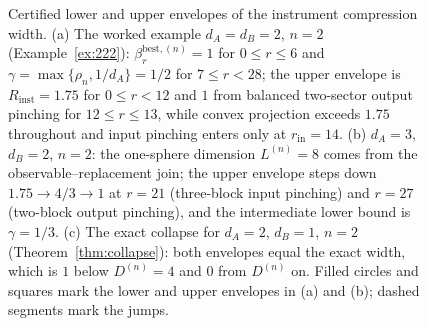 \documentclass[11pt,a4paper]{article}
\begin{document}
\begin{figure}[t]
\medskip
{}
{\small\caption{Certified lower and upper envelopes of the instrument compression width. (a) The worked example $d_A=d_B=2$, $n=2$ (Example~\ref{ex:222}): $\beta_r^{\mathrm{best},(n)}=1$ for $0\le r\le6$ and $\gamma=\max\{\rho_n,1/d_A\}=1/2$ for $7\le r<28$; the upper envelope is $R_{\mathrm{inst}}=1.75$ for $0\le r<12$ and $1$ from balanced two-sector output pinching for $12\le r\le13$, while convex projection exceeds $1.75$ throughout and input pinching enters only at $r_{\mathrm{in}}=14$. (b) $d_A=3$, $d_B=2$, $n=2$: the one-sphere dimension $L^{(n)}=8$ comes from the observable--replacement join; the upper envelope steps down $1.75\to4/3\to1$ at $r=21$ (three-block input pinching) and $r=27$ (two-block output pinching), and the intermediate lower bound is $\gamma=1/3$. (c) The exact collapse for $d_A=2$, $d_B=1$, $n=2$ (Theorem~\ref{thm:collapse}): both envelopes equal the exact width, which is $1$ below $D^{(n)}=4$ and $0$ from $D^{(n)}$ on. Filled circles and squares mark the lower and upper envelopes in (a) and (b); dashed segments mark the jumps.}
}
\label{fig:envelope}
\end{figure}
\end{document}
